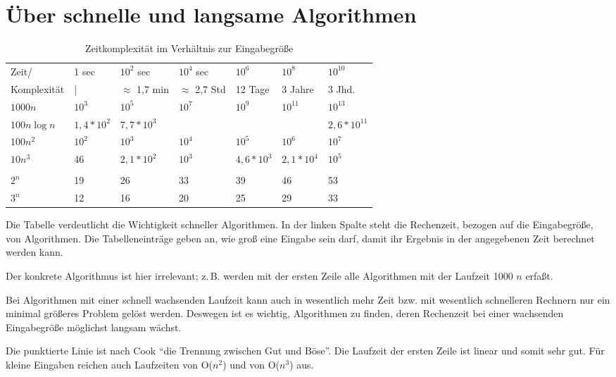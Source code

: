 \documentclass[ngerman,draft,parskip=half*,twoside]{scrreprt}
\theoremstyle{break}
\begin{document}
\section{Über schnelle und langsame Algorithmen}
\begin{table}[h]
  \begin{tabular}{*{7}{|l}|}
    \hline
    Zeit/ & 1 sec & $10^2$ sec & $10^4$ sec & $10^6$ & $10^8$ & $10^{10}$ \\
    Komplexität & | & $\approx$ 1,7 min & $\approx$ 2,7 Std & 12 Tage & 3 Jahre & 3 Jhd.\\
    \hline
    $1000n$ & $10^3$ & $10^5$ & $10^7$ & $10^9$ & $10^{11}$ & $10^{13}$ \\
    $100n\log n$ & $1,4*10^2$ & $7,7*10^3$ & & & & $2,6*10^{11}$ \\
    $100n^2$ & $10^2$ & $10^3$ & $10^4$ & $10^5$ & $10^6$ & $10^7$\\
    $10n^3$ & 46 & $2,1*10^2$ & $10^3$ & $4,6*10^3$ & $2,1*10^4$ & $10^5$ \\
    \\
    $2^n$ & 19 & 26 & 33 & 39 & 46 & 53\\
    $3^n$ & 12 & 16 & 20 & 25 & 29 & 33\\
    \hline
  \end{tabular}
  \caption{Zeitkomplexität im Verhältnis zur Eingabegröße}
\end{table}

Die Tabelle verdeutlicht die Wichtigkeit schneller Algorithmen. 
In der linken Spalte steht die Rechenzeit, bezogen auf die Eingabegröße, von Algorithmen. 
Die Tabelleneinträge geben an, wie groß eine Eingabe sein darf, damit ihr Ergebnis in der angegebenen Zeit berechnet werden kann. 

Der konkrete Algorithmus ist hier irrelevant; z.\,B. werden mit der ersten Zeile alle Algorithmen mit der Laufzeit 1000 $n$ erfaßt. 

Bei Algorithmen mit einer schnell wachsenden Laufzeit kann auch in wesentlich mehr Zeit bzw. mit wesentlich schnelleren Rechnern nur ein
minimal größeres Problem gelöst werden. Deswegen ist es wichtig, Algorithmen zu finden, deren Rechenzeit bei einer wachsenden
Eingabegröße möglichst langsam wächst.

Die punktierte Linie ist nach Cook "`die Trennung zwischen Gut und
Böse"'. Die Laufzeit der ersten Zeile ist linear und somit sehr gut.
Für kleine Eingaben reichen auch Laufzeiten von O($n^2$) und von O($n^3$) aus.
\end{document}
